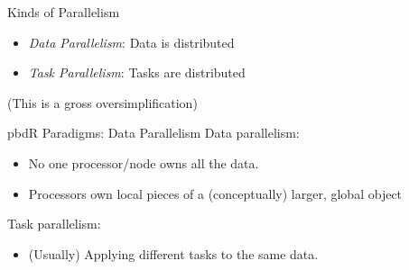 \begin{frame}
  \begin{block}{Kinds of Parallelism}\pause
    \begin{itemize}[<+-|alert@+>]
      \item \emph{Data Parallelism}:  Data is distributed
      \item \emph{Task Parallelism}:  Tasks are distributed
  \end{itemize}
  (This is a gross oversimplification)
  \end{block}
\end{frame}


\begin{frame}
  \begin{block}{pbdR Paradigms:  Data Parallelism}
  Data parallelism:
  \begin{itemize}[<+-|alert@+>]
   \item No one processor/node owns all the data.
   \item Processors own local pieces of a (conceptually) larger, global object
  \end{itemize}
  
  Task parallelism:
  \begin{itemize}
    \item (Usually) Applying different tasks to the same data.
  \end{itemize}
  \end{block}
\end{frame}



